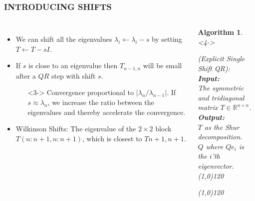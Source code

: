 \documentclass[a4paper,8pt]{beamer} %
\newtheorem{algo}{Algorithm}%
\begin{document}
\begin{frame}  %
\frametitle{INTRODUCING SHIFTS}
\begin{columns}

\column{7cm}
\begin{itemize}
	\item <1-> We can shift all the eigenvalues $\lambda_i\gets\lambda_{i}-s$ 
	by setting $T\gets T-sI$.
	\item <2->
	If $s$ is close to an eigenvalue then 
	$T_{n-1,n}$ will be small after a $QR$ step with shift $s$. 
	\begin{enumerate}
	\item[]<3->
	Convergence %
	proportional to $|\lambda_{n}/\lambda_{n-1}|$.
	If $s\approx\lambda_{n}$, we increase the ratio
	between the eigenvalues and thereby accelerate the convergence. 
	\end{enumerate}
	\item <4-> Wilkinson Shifts: The eigenvalue of the $2\times2$ block $T(n:n+1, n:n+1)$, which
	is closest to $T{n+1,n+1}$. %
\end{itemize}

\column{5cm}
%
%
\begin{algo} <4->
\begin{footnotesize}
{
%
	(Explicit Single Shift QR):
%
}\\
\textbf{Input: }
{
%
	\\The symmetric and tridiagonal matrix $T\in\mathbb R^{n\times n}$.
%
}\\
\textbf{Output: }
{
%
	\\$T$ as the Shur decomposition.
	\\$Q$ where $Qe_i$ is the $i$'th eigenvector.
%
}\\
\line(1,0){120}
\begin{algorithmic}
%
\EndFor{}
%
\end{algorithmic}
\label{algQRSingleShiflExplicit}
\line(1,0){120}
\end{footnotesize}
\end{algo}
%
\end{columns}
\end{frame} %
\end{document}
